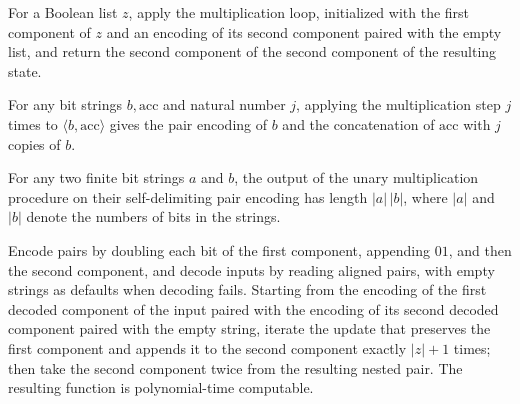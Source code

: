 \begin{definition}
\label{Complexity.BinArith.mulU}
\leanok
{}
For a Boolean list $z$, apply the multiplication loop, initialized with the first
component of $z$ and an encoding of its second component paired with the empty list, and
return the second component of the second component of the resulting state.
\end{definition}

\begin{theorem}
\label{Complexity.BinArith.iterate_mulUStep}
\leanok
{}
For any bit strings $b,\mathrm{acc}$ and natural number $j$, applying the multiplication
step $j$ times to $\langle b,\mathrm{acc}\rangle$ gives the pair encoding of $b$ and the
concatenation of $\mathrm{acc}$ with $j$ copies of $b$.
\end{theorem}

\begin{theorem}
\label{Complexity.BinArith.length_mulU}
\leanok
{}
For any two finite bit strings $a$ and $b$, the output of the unary multiplication
procedure on their self-delimiting pair encoding has length $|a|\,|b|$, where $|a|$ and
$|b|$ denote the numbers of bits in the strings.
\end{theorem}

\begin{theorem}
\label{Complexity.BinArith.polyTimeComputable_mulU}
\leanok
{}
Encode pairs by doubling each bit of the first component, appending $01$, and then the
second component, and decode inputs by reading aligned pairs, with empty strings as
defaults when decoding fails. Starting from the encoding of the first decoded component
of the input paired with the encoding of its second decoded component paired with the
empty string, iterate the update that preserves the first component and appends it to
the second component exactly $|z|+1$ times; then take the second component twice from
the resulting nested pair. The resulting function is polynomial-time computable.
\end{theorem}

